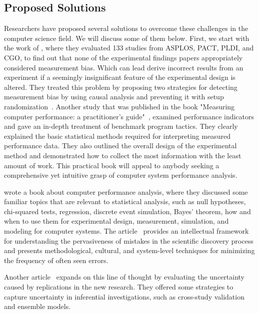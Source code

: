 \subsection{Proposed Solutions}\label{sec:soa_reproducibility}
Researchers have proposed several solutions to overcome these challenges in the computer science field. We will discuss some of them below.
First, we start with the work of \citeauthor{mytkowicz2009producing}, where they evaluated 133 studies from ASPLOS, PACT, PLDI, and CGO, to find out that none of the experimental findings papers appropriately considered measurement bias. Which can lead derive incorrect results from an experiment if a seemingly insignificant feature of the experimental design is altered. They treated this problem by proposing two strategies for detecting measurement bias by using causal analysis and preventing it with setup randomization~\cite{mytkowicz2009producing}.
Another study that was published in the book "Measuring computer performance: a practitioner's guide"~\cite{lilja2005measuring},\citeauthor{lilja2005measuring} examined performance indicators and gave an in-depth treatment of benchmark program tactics. They clearly explained the basic statistical methods required for interpreting measured performance data.
They also outlined the overall design of the experimental method and demonstrated how to collect the most information with the least amount of work.
This practical book will appeal to anybody seeking a comprehensive yet intuitive grasp of computer system performance analysis.

\citeauthor{bukh1992art} wrote a book about computer performance analysis, where they discussed some familiar topics that are relevant to statistical analysis, such as null hypotheses, chi-squared tests, regression, discrete event simulation, Bayes' theorem, how and when to use them for experimental design, measurement, simulation, and modeling for computer systems.
The article~\cite{brown2018issues} provides an intellectual framework for understanding the pervasiveness of mistakes in the scientific discovery process and presents methodological, cultural, and system-level techniques for minimizing the frequency of often seen errors.

Another article~\cite{patil2018training} expands on this line of thought by evaluating the uncertainty caused by replications in the new research.
They offered some strategies to capture uncertainty in inferential investigations, such as cross-study validation and ensemble models.

